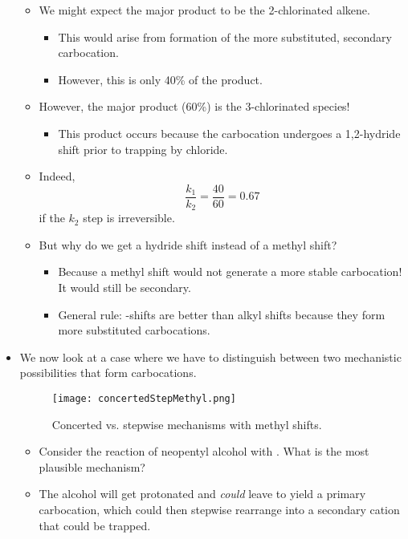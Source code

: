 \documentclass[../notes.tex]{subfiles}
\begin{document}
\begin{itemize}
\begin{itemize}
        \item We might expect the major product to be the 2-chlorinated alkene.
        \begin{itemize}
            \item This would arise from formation of the more substituted, secondary carbocation.
            \item However, this is only 40\% of the product.
        \end{itemize}
        \item However, the major product (60\%) is the 3-chlorinated species!
        \begin{itemize}
            \item This product occurs because the carbocation undergoes a 1,2-hydride shift prior to trapping by chloride.
        \end{itemize}
        \item Indeed,
        \begin{equation*}
            \frac{k_1}{k_2} = \frac{40}{60} = 0.67
        \end{equation*}
        if the $k_2$ step is irreversible.
        \item But why do we get a hydride shift instead of a methyl shift?
        \begin{itemize}
            \item Because a methyl shift would not generate a more stable carbocation! It would still be secondary.
            \item General rule: -shifts are better than alkyl shifts because they form more substituted carbocations.
        \end{itemize}
    \end{itemize}
    \item We now look at a case where we have to distinguish between two mechanistic possibilities that form carbocations.
    \begin{figure}[h!]
        \centering
        \texttt{[image: concertedStepMethyl.png]}
        \caption{Concerted vs. stepwise mechanisms with methyl shifts.}
        \label{fig:concertedStepMethyl}
    \end{figure}
    \begin{itemize}
        \item Consider the reaction of neopentyl alcohol with . What is the most plausible mechanism?
        \item The alcohol will get protonated and \emph{could} leave to yield a primary carbocation, which could then stepwise rearrange into a secondary cation that could be trapped.

\end{itemize}
\end{itemize}
\end{document}
